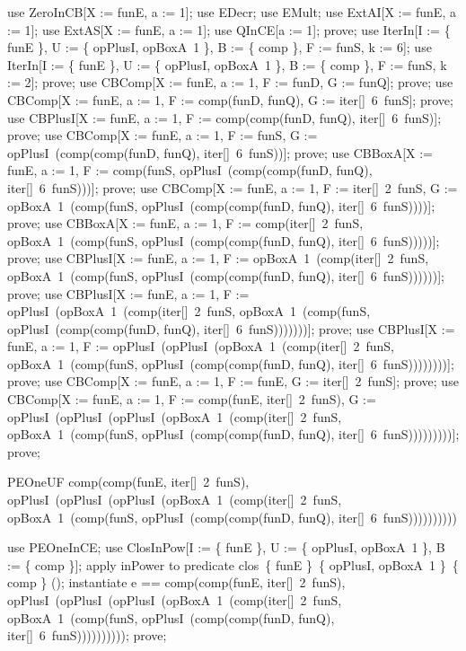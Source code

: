 \documentclass{article}
\begin{document}
\begin{zproof}
use ZeroInCB[X := funE, a := 1];
use EDecr;
use EMult;
use ExtAI[X := funE, a := 1];
use ExtAS[X := funE, a := 1];
use QInCE[a := 1];
prove;
use IterIn[I := \{ funE \}, U := \{ opPlusI, opBoxA~1 \}, B := \{ comp \}, F := funS, k := 6];
use IterIn[I := \{ funE \}, U := \{ opPlusI, opBoxA~1 \}, B := \{ comp \}, F := funS, k := 2];
prove;
use CBComp[X := funE, a := 1, F := funD, G := funQ];
prove;
use CBComp[X := funE, a := 1, F := comp(funD, funQ), G := iter[\nat]~6~funS];
prove;
use CBPlusI[X := funE, a := 1, F := comp(comp(funD, funQ), iter[\nat]~6~funS)];
prove;
use CBComp[X := funE, a := 1, F := funS, G := opPlusI~(comp(comp(funD, funQ), iter[\nat]~6~funS))];
prove;
use CBBoxA[X := funE, a := 1, F := comp(funS, opPlusI~(comp(comp(funD, funQ), iter[\nat]~6~funS)))];
prove;
use CBComp[X := funE, a := 1, F := iter[\nat]~2~funS, G := opBoxA~1~(comp(funS, opPlusI~(comp(comp(funD, funQ), iter[\nat]~6~funS))))];
prove;
use CBBoxA[X := funE, a := 1, F := comp(iter[\nat]~2~funS, opBoxA~1~(comp(funS, opPlusI~(comp(comp(funD, funQ), iter[\nat]~6~funS)))))];
prove;
use CBPlusI[X := funE, a := 1, F := opBoxA~1~(comp(iter[\nat]~2~funS, opBoxA~1~(comp(funS, opPlusI~(comp(comp(funD, funQ), iter[\nat]~6~funS))))))];
prove;
use CBPlusI[X := funE, a := 1, F := opPlusI~(opBoxA~1~(comp(iter[\nat]~2~funS, opBoxA~1~(comp(funS, opPlusI~(comp(comp(funD, funQ), iter[\nat]~6~funS)))))))];
prove;
use CBPlusI[X := funE, a := 1, F := opPlusI~(opPlusI~(opBoxA~1~(comp(iter[\nat]~2~funS, opBoxA~1~(comp(funS, opPlusI~(comp(comp(funD, funQ), iter[\nat]~6~funS))))))))];
prove;
use CBComp[X := funE, a := 1, F := funE, G := iter[\nat]~2~funS];
prove;
use CBComp[X := funE, a := 1, F := comp(funE, iter[\nat]~2~funS), G := opPlusI~(opPlusI~(opPlusI~(opBoxA~1~(comp(iter[\nat]~2~funS, opBoxA~1~(comp(funS, opPlusI~(comp(comp(funD, funQ), iter[\nat]~6~funS)))))))))];
prove;
\end{zproof}

\begin{theorem}{PEOneUF}
  comp(comp(funE, iter[\nat]~2~funS), opPlusI~(opPlusI~(opPlusI~(opBoxA~1~(comp(iter[\nat]~2~funS, opBoxA~1~(comp(funS, opPlusI~(comp(comp(funD, funQ), iter[\nat]~6~funS)))))))))) \in \nat \fun \nat
\end{theorem}

\begin{zproof}
use PEOneInCE;
use ClosInPow[I := \{ funE \}, U := \{ opPlusI, opBoxA~1 \}, B := \{ comp \}];
apply inPower to predicate clos~\{ funE \}~\{ opPlusI, opBoxA~1 \}~\{ comp \} \in \power (\nat \fun \nat);
instantiate e == comp(comp(funE, iter[\nat]~2~funS), opPlusI~(opPlusI~(opPlusI~(opBoxA~1~(comp(iter[\nat]~2~funS, opBoxA~1~(comp(funS, opPlusI~(comp(comp(funD, funQ), iter[\nat]~6~funS))))))))));
prove;
\end{zproof}
\end{document}

